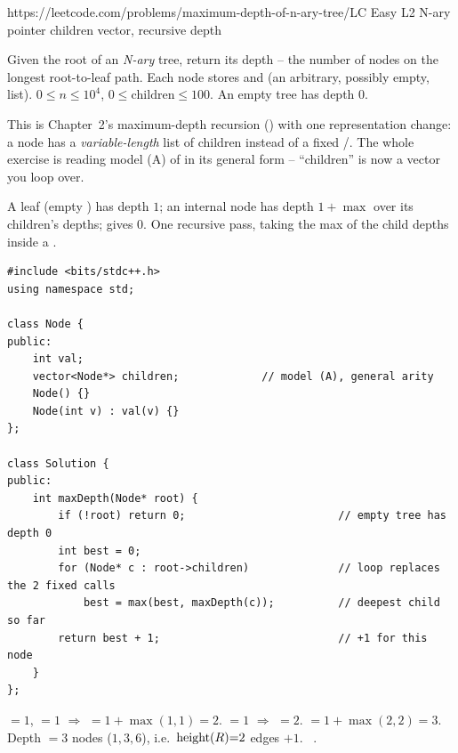   {https://leetcode.com/problems/maximum-depth-of-n-ary-tree/}{LC Easy L2}
  {N-ary pointer children vector, recursive depth}

\begin{problemstatement}
Given the root of an \emph{N-ary} tree, return its depth -- the number of nodes on the
longest root-to-leaf path. Each node stores  and  (an arbitrary, possibly empty, list). $0 \le n \le 10^4$, $0 \le \text{children}
\le 100$. An empty tree has depth $0$.
\end{problemstatement}

This is Chapter~2's maximum-depth recursion () with one
representation change: a node has a \emph{variable-length} list of children instead of a
fixed /. The whole exercise is reading model (A) of
 in its general form -- ``children'' is now a vector you loop over.

A leaf (empty ) has depth $1$; an internal node has depth $1 + \max$ over
its children's depths;  gives $0$. One recursive pass, taking the max of the
child depths inside a .

\begin{lstlisting}[caption={Maximum Depth of an N-ary Tree (LeetCode 559)}, label={lst:c04-nary-depth}]
#include <bits/stdc++.h>
using namespace std;

class Node {
public:
    int val;
    vector<Node*> children;             // model (A), general arity
    Node() {}
    Node(int v) : val(v) {}
};

class Solution {
public:
    int maxDepth(Node* root) {
        if (!root) return 0;                        // empty tree has depth 0
        int best = 0;
        for (Node* c : root->children)              // loop replaces the 2 fixed calls
            best = max(best, maxDepth(c));          // deepest child so far
        return best + 1;                            // +1 for this node
    }
};
\end{lstlisting}

\begin{tracebox}
$=1$, $=1$ $\Rightarrow$ $=1{+}\max(1,1)=2$.
$=1$ $\Rightarrow$ $=2$. $=1{+}\max(2,2)=3$.
Depth $=3$ nodes ($1,3,6$), i.e.\ $\operatorname{height}(R){=}2$ edges $+1$. \checkmark\ .
\end{tracebox}

